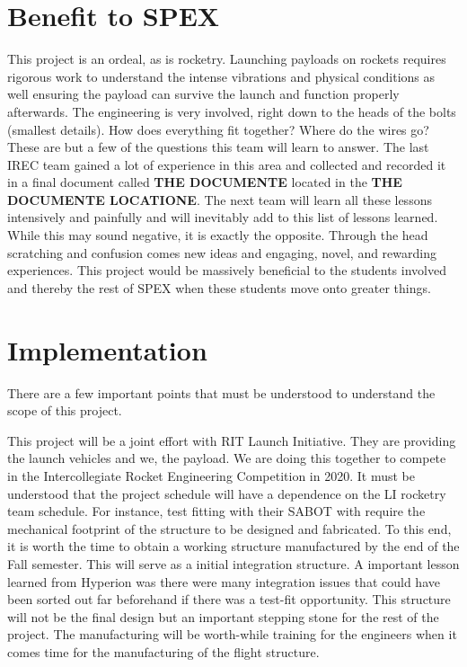 \documentclass[conference]{IEEEtran} %
\begin{document}
\section{Benefit to SPEX}
\label{sec:benefit}

This project is an ordeal, as is rocketry. Launching payloads on rockets requires rigorous work to understand the intense vibrations and physical conditions as well ensuring the 
payload can survive the launch and function properly afterwards. The engineering is very involved, right down to the heads of the bolts (smallest details). How does everything 
fit together? Where do the wires go? These are but a few of the questions this team will learn to answer. The last IREC team gained a lot of experience in this area and collected 
and recorded it in a final document called \textbf{THE DOCUMENTE} located in the \textbf{THE DOCUMENTE LOCATIONE}. The next team will learn all these lessons intensively and painfully 
and will inevitably add to this list of lessons learned. While this may sound negative, it is exactly the opposite. Through the head scratching and confusion comes new ideas and engaging, 
novel, and rewarding experiences. This project would be massively beneficial to the students involved and thereby the rest of SPEX when these students move onto greater things. 

\section{Implementation}
\label{sec:implementation}

There are a few important points that must be understood to understand the scope of this project. 

This project will be a joint effort with RIT Launch Initiative. They are providing the launch vehicles and we, the payload. We are doing this together to compete in the 
Intercollegiate Rocket Engineering Competition in 2020. It must be understood that the project schedule will have a dependence on the LI rocketry team schedule. For instance, 
test fitting with their SABOT with require the mechanical footprint of the structure to be designed and fabricated. To this end, it is worth the time to obtain a working structure 
manufactured by the end of the Fall semester. This will serve as a initial integration structure. A important lesson learned from Hyperion was there were many integration 
issues that could have been sorted out far beforehand if there was a test-fit opportunity. This structure will not be the final design but an important stepping stone for the 
rest of the project. The manufacturing will be worth-while training for the engineers when it comes time for the manufacturing of the flight structure. 
\end{document}
